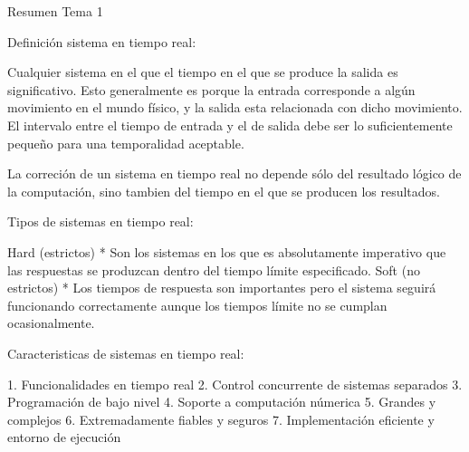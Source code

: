 Resumen Tema 1

Definición sistema en tiempo real:

Cualquier sistema en el que el tiempo en el que se produce la salida es 
significativo. Esto generalmente es porque la entrada corresponde a algún 
movimiento en el mundo físico, y la salida esta relacionada con dicho 
movimiento. El intervalo entre el tiempo de entrada y el de salida debe ser
lo suficientemente pequeño para una temporalidad aceptable.

La correción de un sistema en tiempo real no depende sólo del resultado 
lógico de la computación, sino tambien del tiempo en el que se producen los 
resultados.

Tipos de sistemas en tiempo real:

	Hard (estrictos) 
		* Son los sistemas en los que es absolutamente imperativo
		que las respuestas se produzcan dentro del tiempo límite
		especificado.
	Soft (no estrictos)
		* Los tiempos de respuesta son importantes pero el sistema
		seguirá funcionando correctamente aunque los tiempos límite
		no se cumplan ocasionalmente.

Caracteristicas de sistemas en tiempo real:

	1. Funcionalidades en tiempo real
	2. Control concurrente de sistemas separados
	3. Programación de bajo nivel
	4. Soporte a computación númerica
	5. Grandes y complejos
	6. Extremadamente fiables y seguros
	7. Implementación eficiente y entorno de ejecución
